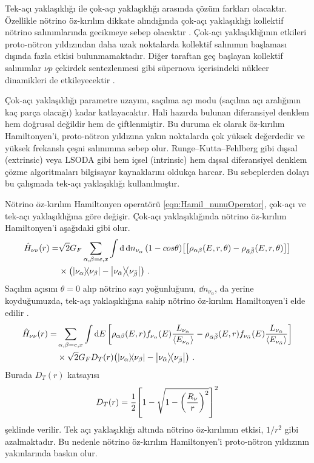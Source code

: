 Tek-açı yaklaşıklığı ile çok-açı yaklaşıklığı arasında çözüm farkları olacaktır. Özellikle nötrino öz-kırılım dikkate alındığında çok-açı yaklaşıklığı kollektif nötrino salınımlarında gecikmeye sebep olacaktır \cite{Duan:2010bf}. Çok-açı yaklaşıklığının etkileri proto-nötron yıldızından daha uzak noktalarda kollektif salınımın başlaması dışında fazla etkisi bulunmamaktadır. Diğer taraftan geç başlayan kollektif salınımlar $ \nu p $ çekirdek sentezlenmesi gibi süpernova içerisindeki nükleer dinamikleri de etkileyecektir \cite{Sasaki:2017jry}.

Çok-açı yaklaşıklığı parametre uzayını, saçılma açı modu (saçılma açı aralığının kaç parça olacağı) kadar katlayacaktır. Hali hazırda bulunan diferansiyel denklem hem doğrusal değildir hem de çiftlenmiştir. Bu duruma ek olarak öz-kırılım Hamiltonyen'i, proto-nötron yıldızına yakın noktalarda çok yüksek değerdedir ve yüksek frekanslı çeşni salınımına sebep olur. Runge–Kutta–Fehlberg gibi dışsal (extrinsic) veya LSODA gibi hem içsel (intrinsic) hem dışsal diferansiyel denklem çözme algoritmaları bilgisayar kaynaklarını oldukça harcar. Bu sebeplerden dolayı bu çalışmada tek-açı yaklaşıklığı kullanılmıştır.

Nötrino öz-kırılım Hamiltonyen operatörü \eqref{eqn:Hamil_nunuOperator}, çok-açı ve tek-açı yaklaşıklığına göre değişir. Çok-açı yaklaşıklığında nötrino öz-kırılım Hamiltonyen'i aşağıdaki gibi olur.
\begin{align}
    \nonumber \hat{H}_{\nu\nu}(r)=& \sqrt{2}G_{F} \sum_{\alpha,\beta = e,x} \int \dd{\dd{n_{\nu_{\alpha}}}} (1-cos \theta) \qty[\qty[\rho_{\alpha\beta}(E,r,\theta)-\rho_{\bar{\alpha}\bar{\beta}}(E,r,\theta)]] \\
    &\times \qty(\dyad{\nu_{\alpha}}{\nu_{\beta}}-\dyad{\nu_{\bar{\alpha}}}{\nu_{\bar{\beta}}}) \text{ .}
\end{align}
Saçılım açısını $ \theta=0 $ alıp nötrino sayı yoğunluğunu, $ \dd{n_{\nu_{\alpha}}} $, da yerine koyduğumuzda, tek-açı yaklaşıklığına sahip nötrino öz-kırılım Hamiltonyen'i elde edilir \cite{Duan:2006an}.
\begin{align}
    \nonumber \hat{H}_{\nu\nu}(r)=& \sum_{\alpha,\beta = e,x} \int \dd{E} \qty[\rho_{\alpha\beta}(E,r)f_{\nu_{\alpha}}(E) \frac{L_{\nu_{\alpha}}}{\expval{E_{\nu_{\alpha}}}} -\rho_{\bar{\alpha}\bar{\beta}}(E,r) f_{\nu_{\bar{\alpha}}}(E) \frac{L_{\nu_{\bar{\alpha}}}}{\expval{E_{\nu_{\bar{\alpha}}}}} ] \\
    &\times \sqrt{2}G_{F} D_{T}(r)\qty(\dyad{\nu_{\alpha}}{\nu_{\beta}}-\dyad{\nu_{\bar{\alpha}}}{\nu_{\bar{\beta}}}) \text{ .}
\end{align}
Burada $ D_{T}(r) $ katsayısı
\begin{equation}
    D_{T}(r) = \frac{1}{2} \qty[1- \sqrt{1- \qty(\frac{R_{\nu}}{r})^{2}}]^{2}
\end{equation}
şeklinde verilir. Tek açı yaklaşıklığı altında nötrino öz-kırılımın etkisi, $ 1/r^{2} $ gibi azalmaktadır. Bu nedenle nötrino öz-kırılım Hamiltonyen'i proto-nötron yıldızının yakınlarında baskın olur.

